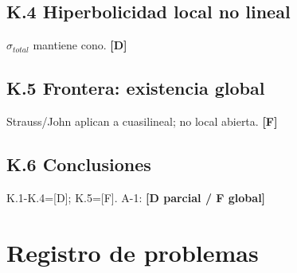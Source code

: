 ﻿\documentclass[11pt,letterpaper]{article}
\begin{document}
\subsection{K.4 Hiperbolicidad local no lineal}
$\sigma_{total}$ mantiene cono. \textbf{[D]}
\subsection{K.5 Frontera: existencia global}
Strauss/John aplican a cuasilineal; no local abierta. \textbf{[F]}
\subsection{K.6 Conclusiones}
K.1-K.4=[D]; K.5=[F]. A-1: \textbf{[D parcial / F global]}
\newpage
\section*{Registro de problemas}
\end{document}
